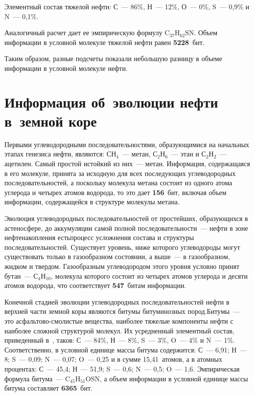\begin{multicols}{2}
     Элементный состав тяжелой нефти: С~--- 86\%, Н~--- 12\%, О~--- 0\%, S~--- 0,9\% 
и N~--- 0,1\%.
     
     Аналогичный расчет дает ее эмпирическую формулу C$_{37}$H$_{62}$SN. 
Объем информации в условной молекуле тяжелой нефти равен \textbf{5228}~бит.
     
     Таким образом, разные подсчеты показали небольшую разницу в объеме 
информации в условной молекуле нефти.
     
\section{Информация об~эволюции нефти в~земной коре}

     Первыми углеводородными последователь\-ностями, образующимися на 
начальных этапах генезиса нефти, являются: СН$_4$~--- метан, С$_2$Н$_6$~--- этан и 
С$_2$Н$_2$~--- ацетилен. Самый простой и\linebreak стойкий из них~--- метан. Информация, 
содержащаяся в его молекуле, принята за исходную для всех последующих 
углеводородных последовательностей, а поскольку молекула метана состоит из 
одного атома углерода и четырех атомов водорода, то это дает \textbf{156}~бит, 
включая объем информации, содержащейся в структуре молекулы метана. 
     

     Эволюция углеводородных последовательностей от простейших, 
образующихся в астеносфере, до аккумуляции самой полной 
     по\-сле\-до\-ва\-тель\-ности~--- нефти в зоне нефтенакопления есть\linebreak процесс 
усложнения состава и структуры последовательностей. Существует уровень, ниже 
которого углеводороды могут существовать только в газообразном состоянии, а 
выше~--- в газообразном, жидком и твердом. Газообразным углеводородом этого 
уровня условно принят бутан~--- С$_4$Н$_{10}$, молекула которого состоит из 
четырех атомов углерода и десяти атомов водорода, что соответствует 
\textbf{547}~битам информации.
     

     Конечной стадией эволюции углеводородных последовательностей нефти в 
верхней части земной коры являются битумы битуминозных пород.\linebreak Би\-тумы~--- это 
асфальтово-смолистые вещества, наиболее тяжелые компоненты нефти с наиболее 
сложной структурой молекул. Их усредненный элементный состав, приведенный 
в~\cite{16s}, таков: С~--- 84\%, Н~--- 8\%, S~--- 3\%, O~--- 4\% и N~--- 1\%. 
Соответственно, в условной единице массы битума содержится: С~--- 6,91; Н~--- 8; 
S~--- 0,09; N~--- 0,07; O~--- 0,25 и в сумме 15,41~атомов, а в атомных процентах: 
     С~--- 45,4; Н~--- 51,9; S~--- 0,6; N~--- 0,5; O~--- 1,6. Эмпирическая формула 
битума~--- C$_{45}$H$_{51}$OSN, а объем информации в условной единице массы 
битума составляет \textbf{6365}~бит. 
     

\end{multicols}
